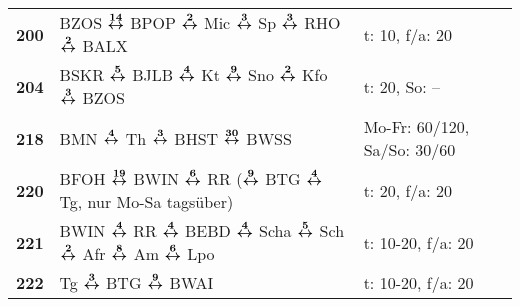 \begin{minipage}[t]{0.45\textwidth}
\begin{tabular}{>{\bfseries}L{1.2cm}L{9.0cm}L{3.0cm}}
\bus{} 200    & BZOS $\xarwe{14}$ BPOP $\xarwe{2}$ Mic $\xarwe{3}$ Sp $\xarwe{3}$ RHO $\xarwe{2}$ BALX                                                                              & t: 10, f/a: 20             \\
\bus{} 204    & BSKR $\xarwe{5}$ BJLB $\xarwe{4}$ Kt $\xarwe{9}$ Sno $\xarwe{2}$ Kfo $\xarwe{3}$ BZOS                                                                               & t: 20, So: --              \\
\bus{} 218    & BMN $\xarwe{4}$ Th $\xarwe{3}$ BHST $\xarwe{30}$ BWSS                                                                                                               & Mo-Fr: 60/120, Sa/So: 30/60\\
\bus{} 220    & BFOH $\xarwe{19}$ BWIN $\xarwe{6}$ RR ($\xarwe{9}$ BTG $\xarwe{4}$ Tg, nur Mo-Sa tagsüber)                                                                          & t: 20, f/a: 20             \\
\bus{} 221    & BWIN $\xarwe{4}$ RR $\xarwe{4}$ BEBD $\xarwe{4}$ Scha $\xarwe{5}$ Sch $\xarwe{2}$ Afr $\xarwe{8}$ Am $\xarwe{6}$ Lpo                                                & t: 10-20, f/a: 20          \\
\bus{} 222    & Tg $\xarwe{3}$ BTG $\xarwe{9}$ BWAI
& t: 10-20, f/a: 20          \\
\hline
\end{tabular}
\end{minipage}
